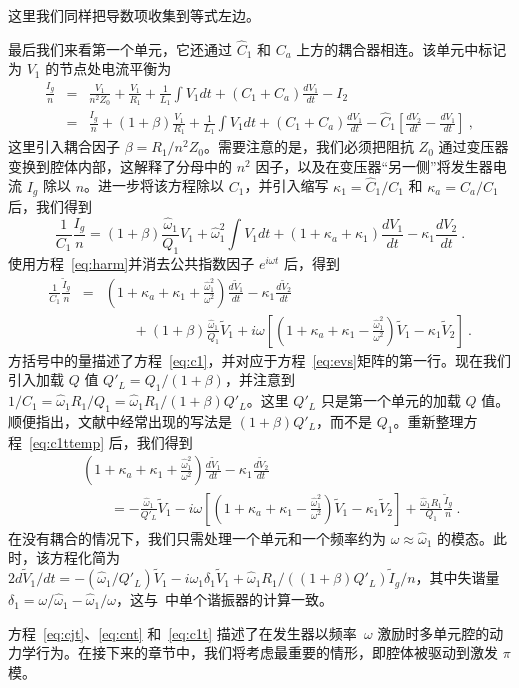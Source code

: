 \documentclass[12pt]{article}
\newcommand\tV{\tilde V}
\newcommand\ho{\hat\omega}
\newcommand\hC{\hat C}
\begin{document}
这里我们同样把导数项收集到等式左边。
\par
最后我们来看第一个单元，它还通过 $\hC_1$ 和 $C_a$ 上方的耦合器相连。该单元中标记为 $V_1$ 的节点处电流平衡为
\begin{eqnarray}
  \frac{I_g}{n} &=& \frac{V_1}{n^2Z_0} + \frac{V_1}{R_1}+\frac{1}{L_1}\int V_1dt
       + \left(C_1+C_a\right)\frac{dV_1}{dt} -I_2\\
   &=& \frac{I_g}{n}+\left( 1+\beta\right) \frac{V_1}{R_1} +\frac{1}{L_1}\int V_1dt
       + \left(C_1+C_a\right)\frac{dV_1}{dt} -\hC_1\left[\frac{dV_2}{dt}-\frac{dV_1}{dt}\right]\ ,
       \nonumber
\end{eqnarray}
这里引入耦合因子 $\beta=R_1/n^2Z_0$。需要注意的是，我们必须把阻抗 $Z_0$ 通过变压器变换到腔体内部，这解释了分母中的 $n^2$ 因子，以及在变压器“另一侧”将发生器电流 $I_g$ 除以 $n$。进一步将该方程除以 $C_1$，并引入缩写 $\kappa_1=\hC_1/C_1$ 和 $\kappa_a=C_a/C_1$ 后，我们得到
\begin{equation}
 \frac{1}{C_1}\frac{I_g}{n} =(1+\beta)\frac{\ho_1}{Q_1}V_1
  +\ho_1^2\int V_1dt+\left(1+\kappa_a+\kappa_1\right)\frac{dV_1}{dt} -\kappa_1\frac{dV_2}{dt}\ .
\end{equation}
使用方程~\ref{eq:harm}并消去公共指数因子 $e^{i\omega t}$ 后，得到
\begin{eqnarray}\label{eq:c1ttemp}
  \frac{1}{C_1}\frac{\tilde I_g}{n}&=&\left(1+\kappa_a+\kappa_1+\frac{\ho_1^2}{\omega^2}\right)\frac{d\tV_1}{dt}
       -\kappa_1\frac{d\tV_2}{dt}\\
     &&\qquad  +(1+\beta)\frac{\ho_1}{Q_1}\tV_1
        +i\omega\left[\left(1+\kappa_a+\kappa_1-\frac{\ho_1^2}{\omega^2}\right)\tV_1
        -\kappa_1\tV_2\right]\ .\nonumber
\end{eqnarray}
方括号中的量描述了方程~\ref{eq:c1}，并对应于方程~\ref{eq:evs}矩阵的第一行。现在我们引入加载 $Q$ 值 $Q'_L=Q_1/(1+\beta)$，并注意到 $1/C_1=\ho_1R_1/Q_1=\ho_1R_1/(1+\beta)Q'_L$。这里 $Q'_L$ 只是第一个单元的加载 $Q$ 值。顺便指出，文献中经常出现的写法是 $(1+\beta)Q'_L$，而不是 $Q_1$。重新整理方程~\ref{eq:c1ttemp} 后，我们得到
\begin{eqnarray}\label{eq:c1t}
  &&\left(1+\kappa_a+\kappa_1+\frac{\ho_1^2}{\omega^2}\right)\frac{d\tV_1}{dt}
  -\kappa_1\frac{d\tV_2}{dt}\\
     &&\qquad=-\frac{\ho_1}{Q'_L}\tV_1
        -i\omega\left[\left(1+\kappa_a+\kappa_1-\frac{\ho_1^2}{\omega^2}\right)\tV_1
        -\kappa_1\tV_2\right] + \frac{\ho_1R_1}{Q_1}\frac{\tilde I_g}{n}\ .\nonumber
\end{eqnarray}
在没有耦合的情况下，我们只需处理一个单元和一个频率约为 $\omega\approx\ho_1$ 的模态。此时，该方程化简为 $2d\tV_1/dt=-(\ho_1/Q'_L)\tV_1-i\ho_1\delta_1\tV_1+\ho_1R_1/((1+\beta)Q'_L){\tilde I_g}/n$，其中失谐量 $\delta_1=\omega/\ho_1-\ho_1/\omega$，这与~\cite{VZAP}中单个谐振器的计算一致。
\par
方程~\ref{eq:cjt}、\ref{eq:cnt} 和~\ref{eq:c1t} 描述了在发生器以频率~$\omega$ 激励时多单元腔的动力学行为。在接下来的章节中，我们将考虑最重要的情形，即腔体被驱动到激发 $\pi$ 模。
% 
\end{document}
